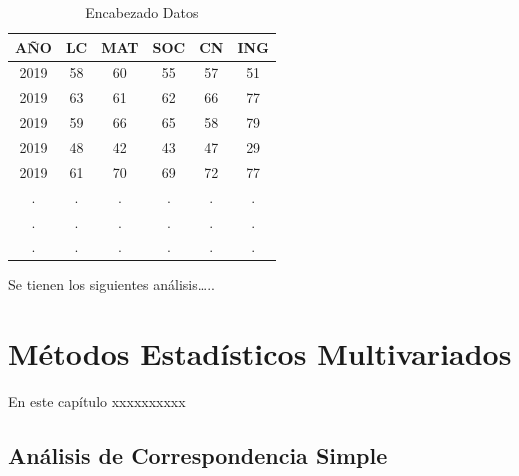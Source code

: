 \documentclass[12pt,a4paper,]{book}
\def\ifdoblecara{} %
\def\ifprincipal{} %
\newcommand{\bcenter}{\begin{center}}
\newcommand{\ecenter}{\end{center}}
\numberwithin{dummy}{section}
\theoremstyle{ocrenumbox}
\theoremstyle{ocrenumbox}
\theoremstyle{ocrenumbox}
\theoremstyle{ocrenumbox}
\theoremstyle{ocrenum}
\begin{document}
\begin{table}[!ht]
\caption{Encabezado Datos}
\label{tabla-1}
\bcenter
\begin{tabular}{cccccc}\hline
AÑO            & LC    & MAT   & SOC   & CN    & ING   \\\hline
2019           & 58    & 60    & 55    & 57    & 51    \\
2019           & 63    & 61    & 62    & 66    & 77    \\
2019           & 59    & 66    & 65    & 58    & 79    \\
2019           & 48    & 42    & 43    & 47    & 29    \\
2019           & 61    & 70    & 69    & 72    & 77    \\
.              & .     & .     & .     & .     & .     \\
.              & .     & .     & .     & .     & .     \\
.              & .     & .     & .     & .     & .     \\\hline
\end{tabular}
\ecenter
\end{table}

Se tienen los siguientes análisis\ldots..

\FloatBarrier

\ifdefined\ifprincipal
\else
\setlength{\parindent}{1em}
\pagestyle{fancy}
\setcounter{tocdepth}{4}
\tableofcontents

\fi

\ifdefined\ifdoblecara
\fancyhead{}{}
\fancyhead[LE,RO]{\scriptsize\rightmark}
\fancyfoot[LO,RE]{\scriptsize\slshape \leftmark}
\fancyfoot[C]{}
\fancyfoot[LE,RO]{\footnotesize\thepage}
\else
\fancyhead{}{}
\fancyhead[RO]{\scriptsize\rightmark}
\fancyfoot[LO]{\scriptsize\slshape \leftmark}
\fancyfoot[C]{}
\fancyfoot[RO]{\footnotesize\thepage}
\fi

\renewcommand{\headrulewidth}{0.4pt}
\renewcommand{\footrulewidth}{0.4pt}

\hypertarget{muxe9todos-estaduxedsticos-multivariados}{%
\chapter{Métodos Estadísticos
Multivariados}\label{muxe9todos-estaduxedsticos-multivariados}}

En este capítulo xxxxxxxxxx

\hypertarget{anuxe1lisis-de-correspondencia-simple}{%
\section{Análisis de Correspondencia
Simple}\label{anuxe1lisis-de-correspondencia-simple}}
\end{document}
